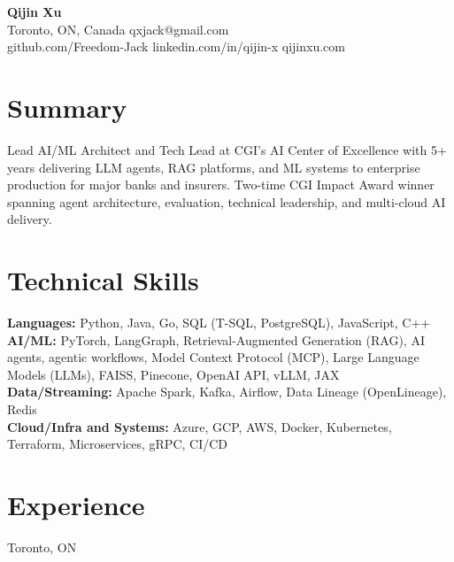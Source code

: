 \documentclass[letterpaper,11pt]{article}
\newcommand{\companyline}[2]{%
  \vspace{3pt}%
  \noindent{\bfseries\fontsize{12.5pt}{13.8pt}\selectfont #1}\hfill{\fontsize{11.5pt}{13pt}\selectfont #2}\par
  \vspace{1pt}%
}
\newcommand{\resumeCompany}[2]{
  \companyline{#1}{#2}
}
\begin{document}
\vspace*{-1.2\baselineskip}

\begin{center}
    {\LARGE \textbf{Qijin Xu}}\\
    \vspace{3pt}
    Toronto, ON, Canada \textbullet{} qxjack@gmail.com \\
    github.com/Freedom-Jack \textbullet{} linkedin.com/in/qijin-x \textbullet{} qijinxu.com
\end{center}

\vspace{-10pt}

\section{Summary}
Lead AI/ML Architect and Tech Lead at CGI's AI Center of Excellence with 5+ years delivering LLM agents, RAG platforms, and ML systems to enterprise production for major banks and insurers. Two-time CGI Impact Award winner spanning agent architecture, evaluation, technical leadership, and multi-cloud AI delivery.

\section{Technical Skills}
\vspace{2pt}
\textbf{Languages:} Python, Java, Go, SQL (T-SQL, PostgreSQL), JavaScript, C++ \\
\textbf{AI/ML:} PyTorch, LangGraph, Retrieval-Augmented Generation (RAG), AI agents, agentic workflows, Model Context Protocol (MCP), Large Language Models (LLMs), FAISS, Pinecone, OpenAI API, vLLM, JAX \\
\textbf{Data/Streaming:} Apache Spark, Kafka, Airflow, Data Lineage (OpenLineage), Redis \\
\textbf{Cloud/Infra and Systems:} Azure, GCP, AWS, Docker, Kubernetes, Terraform, Microservices, gRPC, CI/CD

\section{Experience}

\resumeCompany{CGI Inc.}{Toronto, ON}
\end{document}
